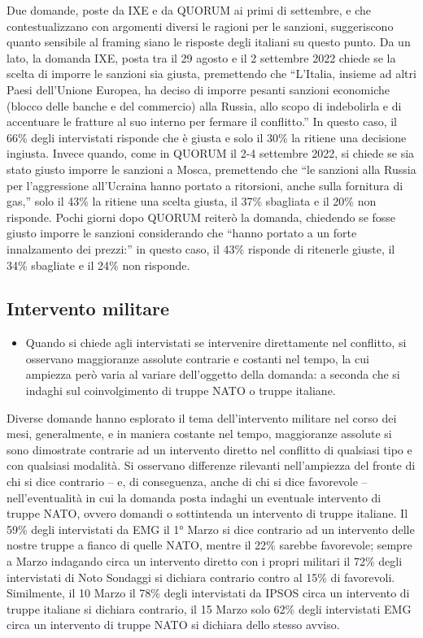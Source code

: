 \documentclass[
]{book}
\providecommand{\tightlist}{%
  \setlength{\itemsep}{0pt}\setlength{\parskip}{0pt}}
\begin{document}
Due domande, poste da IXE e da QUORUM ai primi di settembre, e che contestualizzano con argomenti diversi le ragioni per le sanzioni, suggeriscono quanto sensibile al framing siano le risposte degli italiani su questo punto. Da un lato, la domanda IXE, posta tra il 29 agosto e il 2 settembre 2022 chiede se la scelta di imporre le sanzioni sia giusta, premettendo che ``L'Italia, insieme ad altri Paesi dell'Unione Europea, ha deciso di imporre pesanti sanzioni economiche (blocco delle banche e del commercio) alla Russia, allo scopo di indebolirla e di accentuare le fratture al suo interno per fermare il conflitto.'' In questo caso, il 66\% degli intervistati risponde che è giusta e solo il 30\% la ritiene una decisione ingiusta. Invece quando, come in QUORUM il 2-4 settembre 2022, si chiede se sia stato giusto imporre le sanzioni a Mosca, premettendo che ``le sanzioni alla Russia per l'aggressione all'Ucraina hanno portato a ritorsioni, anche sulla fornitura di gas,'' solo il 43\% la ritiene una scelta giusta, il 37\% sbagliata e il 20\% non risponde. Pochi giorni dopo QUORUM reiterò la domanda, chiedendo se fosse giusto imporre le sanzioni considerando che ``hanno portato a un forte innalzamento dei prezzi:'' in questo caso, il 43\% risponde di ritenerle giuste, il 34\% sbagliate e il 24\% non risponde.

\hypertarget{intervento-militare}{%
\subsection{Intervento militare}\label{intervento-militare}}

\begin{itemize}
\tightlist
\item
  Quando si chiede agli intervistati se intervenire direttamente nel conflitto, si osservano maggioranze assolute contrarie e costanti nel tempo, la cui ampiezza però varia al variare dell'oggetto della domanda: a seconda che si indaghi sul coinvolgimento di truppe NATO o truppe italiane.
\end{itemize}

Diverse domande hanno esplorato il tema dell'intervento militare nel corso dei mesi, generalmente, e in maniera costante nel tempo, maggioranze assolute si sono dimostrate contrarie ad un intervento diretto nel conflitto di qualsiasi tipo e con qualsiasi modalità. Si osservano differenze rilevanti nell'ampiezza del fronte di chi si dice contrario -- e, di conseguenza, anche di chi si dice favorevole -- nell'eventualità in cui la domanda posta indaghi un eventuale intervento di truppe NATO, ovvero domandi o sottintenda un intervento di truppe italiane. Il 59\% degli intervistati da EMG il 1° Marzo si dice contrario ad un intervento delle nostre truppe a fianco di quelle NATO, mentre il 22\% sarebbe favorevole; sempre a Marzo indagando circa un intervento diretto con i propri militari il 72\% degli intervistati di Noto Sondaggi si dichiara contrario contro al 15\% di favorevoli.
Similmente, il 10 Marzo il 78\% degli intervistati da IPSOS circa un intervento di truppe italiane si dichiara contrario, il 15 Marzo solo 62\% degli intervistati EMG circa un intervento di truppe NATO si dichiara dello stesso avviso.
\end{document}
